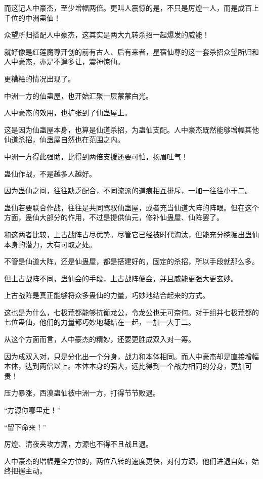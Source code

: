 \begin{this_body}
而这记人中豪杰，至少增幅两倍。更叫人震惊的是，不只是厉煌一人，而是成百上千位的中洲蛊仙！

众望所归搭配人中豪杰，这其实是两大九转杀招一起爆发的威能！

就好像是红莲魔尊开创的前有古人、后有来者，星宿仙尊的这一套杀招众望所归和人中豪杰，亦是不遑多让，震神惊仙。

更糟糕的情况出现了。

中洲一方的仙蛊屋，也开始汇聚一层蒙蒙白光。

人中豪杰的效用，也扩张到了仙蛊屋上。

这是因为仙蛊屋本身，也算是仙道杀招，为蛊仙支配。人中豪杰既然能够增幅其他仙道杀招，仙蛊屋自然也在范围之内。

中洲一方得此强助，比得到两倍支援还要可怕，扬眉吐气！

蛊仙作战，不是越多人越好。

因为蛊仙之间，往往缺乏配合，不同流派的道痕相互排斥，一加一往往小于二。

蛊仙若要联合作战，往往是共同驾驭仙蛊屋，或者充当仙道大阵的阵眼。但在这个方面，蛊仙大部分的作用，不过是提供仙元，修补仙蛊屋、仙阵罢了。

和这两者比较，上古战阵占尽优势。尽管它已经被时代淘汰，但能充分挖掘出蛊仙本身的潜力，大有可取之处。

不管是仙道大阵，还是仙蛊屋，都是搭建好的，固定的杀招，所以手段就那么多。

但上古战阵不同，蛊仙会的手段，上古战阵便会，并且威能更强大更玄妙。

上古战阵是真正能够将众多蛊仙的力量，巧妙地结合起来的方式。

这也是为什么，七极荒都能够抗衡龙公，令龙公也无可奈何。对于组并七极荒都的七位蛊仙，他们的力量都巧妙地凝结在一起，一加一大于二。

从这个方面而言，人中豪杰的精妙，还要更胜成双入对一筹。

因为成双入对，只是分化出一个分身，战力和本体相同。而人中豪杰却是直接增幅本体，达到两倍以上。本体本身的强大，远比得到一个战力相同的分身，更加可贵！

压力暴涨，西漠蛊仙被中洲一方，打得节节败退。

“方源你哪里走！”

“留下命来！”

厉煌、清夜夹攻方源，方源也不得不且战且退。

人中豪杰的增幅是全方位的，两位八转的速度更快，对付方源，他们进退自如，始终把握主动。

\end{this_body}

